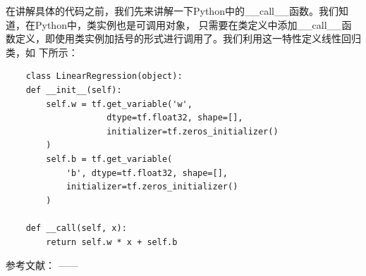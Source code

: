 \documentclass{article}
\begin{document}
在讲解具体的代码之前，我们先来讲解一下Python中的\_\_call\_\_函数。我们知道，在Python中，类实例也是可调用对象，
只需要在类定义中添加\_\_call\_\_函数定义，即使用类实例加括号的形式进行调用了。我们利用这一特性定义线性回归类，如
下所示：
\begin{lstlisting}
    class LinearRegression(object):
    def __init__(self):
        self.w = tf.get_variable('w', 
                    dtype=tf.float32, shape=[], 
                    initializer=tf.zeros_initializer()
        )
        self.b = tf.get_variable(
            'b', dtype=tf.float32, shape=[],
            initializer=tf.zeros_initializer()
        )

    def __call(self, x):
        return self.w * x + self.b
\end{lstlisting}










参考文献：
\cite{ex1}---\cite{ex2}---\cite{refa001}

\newpage




\appendix
\end{document}
